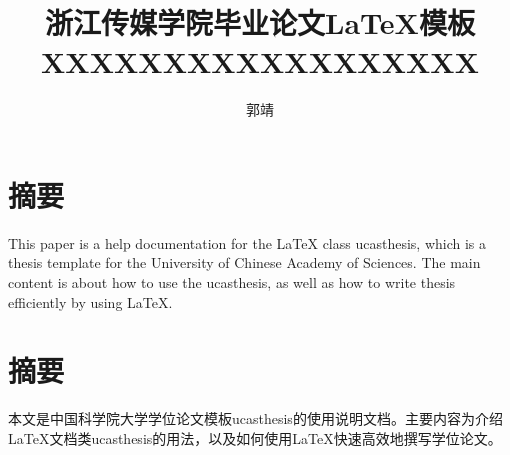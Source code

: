 \confidential{}%
\title{浙江传媒学院毕业论文\LaTeX{}模板XXXXXXXXXXXXXXXXXX}%
\author{郭靖}%
\maketitle%
\makedeclaration%
\nofootermatter
\chapter*{摘要}%

This paper is a help documentation for the \LaTeX{} class ucasthesis, which is  a thesis template for the University of Chinese Academy of Sciences. The main content is about how to use the ucasthesis, as well as how to write thesis efficiently by using \LaTeX{}.

\chapter*{摘要}%

本文是中国科学院大学学位论文模板ucasthesis的使用说明文档。主要内容为介绍\LaTeX{}文档类ucasthesis的用法，以及如何使用\LaTeX{}快速高效地撰写学位论文。

